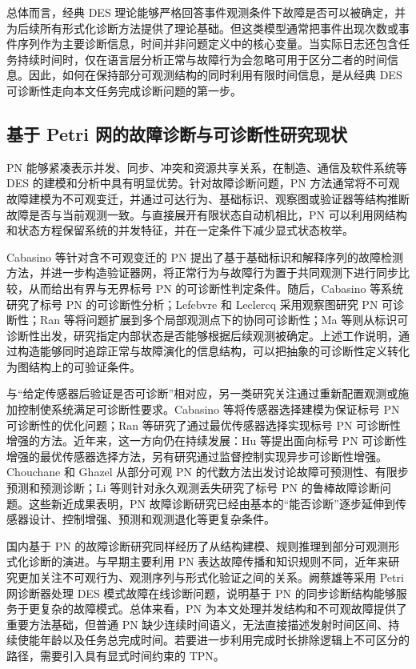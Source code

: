 \documentclass[master,fontset=ubuntu]{shnuthesis}
\theoremstyle{definition}
\begin{document}
总体而言，经典 DES 理论能够严格回答事件观测条件下故障是否可以被确定，并为后续所有形式化诊断方法提供了理论基础。但这类模型通常把事件出现次数或事件序列作为主要诊断信息，时间并非问题定义中的核心变量。当实际日志还包含任务持续时间时，仅在语言层分析正常与故障行为会忽略可用于区分二者的时间信息。因此，如何在保持部分可观测结构的同时利用有限时间信息，是从经典 DES 可诊断性走向本文任务完成诊断问题的第一步。

\subsection{基于 Petri 网的故障诊断与可诊断性研究现状}

PN 能够紧凑表示并发、同步、冲突和资源共享关系，在制造、通信及软件系统等 DES 的建模和分析中具有明显优势\cite{Murata1989}。针对故障诊断问题，PN 方法通常将不可观故障建模为不可观变迁，并通过可达行为、基础标识、观察图或验证器等结构推断故障是否与当前观测一致。与直接展开有限状态自动机相比，PN 可以利用网结构和状态方程保留系统的并发特征，并在一定条件下减少显式状态枚举。

Cabasino 等针对含不可观变迁的 PN 提出了基于基础标识和解释序列的故障检测方法\cite{Cabasino2010}，并进一步构造验证器网，将正常行为与故障行为置于共同观测下进行同步比较，从而给出有界与无界标号 PN 的可诊断性判定条件\cite{Cabasino2012}。随后，Cabasino 等系统研究了标号 PN 的可诊断性分析\cite{Cabasino2014}；Lefebvre 和 Leclercq 采用观察图研究 PN 可诊断性\cite{Lefebvre2016}；Ran 等将问题扩展到多个局部观测点下的协同可诊断性\cite{Ran2018}；Ma 等则从标识可诊断性出发，研究指定内部状态是否能够根据后续观测被确定\cite{Ma2021}。上述工作说明，通过构造能够同时追踪正常与故障演化的信息结构，可以把抽象的可诊断性定义转化为图结构上的可验证条件。

与“给定传感器后验证是否可诊断”相对应，另一类研究关注通过重新配置观测或施加控制使系统满足可诊断性要求。Cabasino 等将传感器选择建模为保证标号 PN 可诊断性的优化问题\cite{Cabasino2013}；Ran 等研究了通过最优传感器选择实现标号 PN 可诊断性增强的方法\cite{Ran2019}。近年来，这一方向仍在持续发展：Hu 等提出面向标号 PN 可诊断性增强的最优传感器选择方法\cite{HuSensor2024}，另有研究通过监督控制实现异步可诊断性增强\cite{HuSupervisor2024}。Chouchane 和 Ghazel 从部分可观 PN 的代数方法出发讨论故障可预测性、有限步预测和预测诊断\cite{Chouchane2024}；Li 等则针对永久观测丢失研究了标号 PN 的鲁棒故障诊断问题\cite{LiRobust2026}。这些新近成果表明，PN 故障诊断研究已经由基本的“能否诊断”逐步延伸到传感器设计、控制增强、预测和观测退化等更复杂条件。

国内基于 PN 的故障诊断研究同样经历了从结构建模、规则推理到部分可观测形式化诊断的演进。与早期主要利用 PN 表达故障传播和知识规则不同，近年来研究更加关注不可观行为、观测序列与形式化验证之间的关系。阙蔡雄等采用 Petri 网诊断器处理 DES 模式故障在线诊断问题\cite{Que2020}，说明基于 PN 的同步诊断结构能够服务于更复杂的故障模式。总体来看，PN 为本文处理并发结构和不可观故障提供了重要方法基础，但普通 PN 缺少连续时间语义，无法直接描述发射时间区间、持续使能年龄以及任务总完成时间。若要进一步利用完成时长排除逻辑上不可区分的路径，需要引入具有显式时间约束的 TPN。
\end{document}
